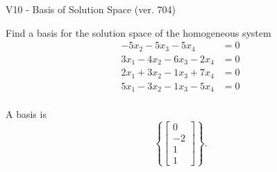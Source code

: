 \begin{exercise}
  \begin{exerciseTitle}V10 - Basis of Solution Space (ver. 704)\end{exerciseTitle}
  \begin{exerciseStatement}
    Find a basis for the solution space of the homogeneous system 
\begin{align*}
 -5 x_ 2 -5 x_ 3 -5 x_ 4 &= 0  \\ 
  3 x_ 1 -4 x_ 2 -6 x_ 3 -2 x_ 4 &= 0  \\ 
  2 x_ 1 + 3 x_ 2 -1 x_ 3 + 7 x_ 4 &= 0  \\ 
  5 x_ 1 -3 x_ 2 -1 x_ 3 -5 x_ 4 &= 0  \\ 
 \end{align*}


 
  \end{exerciseStatement}

  \begin{exerciseAnswer}
   A basis is   
\[\left\{\left[\begin{array}{c}
0 \\
-2 \\
1 \\
1
\end{array}\right]\right\}.\]

  


  \end{exerciseAnswer}
\end{exercise}